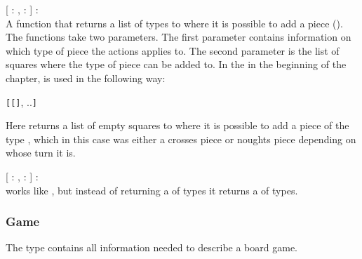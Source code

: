 \begin{dlist}
  \item {}[ : ,  : ] : \\
    A function that returns a list of  types to where it is possible
    to add a piece (). The functions take two parameters. The
    first parameter contains information on which type of piece the actions
    applies to. The second parameter is the list of squares where the type of
    piece can be added to. 
    In the  in the beginning of the chapter,
     is used in the following way:
    
    \begin{center}
      \texttt{[}\texttt{[}\texttt{]},
      ..\texttt{]}
    \end{center}
    
    Here  returns a list of empty squares to where it is
    possible to add a piece of the type , which in this case was
    either a crosses piece or noughts piece depending on whose turn it is.
    
  \item {}[ : ,  : ] : \\
     works like , but instead of
    returning a  of  types it returns a  of
     types.
\end{dlist}

\subsubsection{Game}
The  type contains all information needed to describe a board game. 

